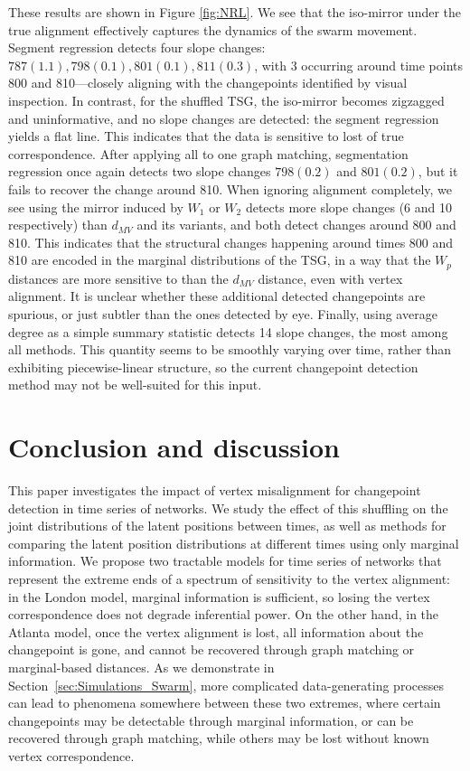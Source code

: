 \documentclass[12pt]{article}
\theoremstyle{definition}
\begin{document}
These results are shown in Figure \ref{fig:NRL}. We see that the iso-mirror under the true alignment effectively captures the dynamics of the swarm movement. Segment regression detects four slope changes: $787(1.1), 798(0.1),801(0.1), 811(0.3)$, with 3 occurring around time points $800$ and 810—closely aligning with the changepoints identified by visual inspection. 
In contrast, for the shuffled TSG, the iso-mirror becomes zigzagged and uninformative, and no slope changes are detected: the segment regression yields a flat line.
This indicates that the data is sensitive to lost of true correspondence.
After applying all to one graph matching, segmentation regression once again detects two slope changes $798(0.2)$ and $801(0.2)$, but it fails to recover the change around 810. 
When ignoring alignment completely, we see using the mirror induced by $W_1$ or $W_2$ detects more slope changes (6 and 10 respectively) than $d_{MV}$ and its variants, and both detect changes around 800 and 810.
This indicates that the structural changes happening around times 800 and 810 are encoded in the marginal distributions of the TSG, in a way that the $W_p$ distances are more sensitive to than the $d_{MV}$ distance, even with vertex alignment. It is unclear whether these additional detected changepoints are spurious, or just subtler than the ones detected by eye. Finally, using average degree as a simple summary statistic detects 14 slope changes, the most among all methods. This quantity seems to be smoothly varying over time, rather than exhibiting piecewise-linear structure, so the current changepoint detection method may not be well-suited for this input.




\section{Conclusion and discussion}\label{sec:Conclusion}

This paper investigates the impact of vertex misalignment for changepoint detection in time series of networks. We study the effect of this shuffling on the joint distributions of the latent positions between times, as well as methods for comparing the latent position distributions at different times using only marginal information. We propose two tractable models for time series of networks that represent the extreme ends of a spectrum of sensitivity to the vertex alignment: in the London model, marginal information is sufficient, so losing the vertex correspondence does not degrade inferential power. On the other hand, in the Atlanta model, once the vertex alignment is lost, all information about the changepoint is gone, and cannot be recovered through graph matching or marginal-based distances. As we demonstrate in Section~\ref{sec:Simulations_Swarm}, more complicated data-generating processes can lead to phenomena somewhere between these two extremes, where certain changepoints may be detectable through marginal information, or can be recovered through graph matching, while others may be lost without known vertex correspondence. 
\end{document}
